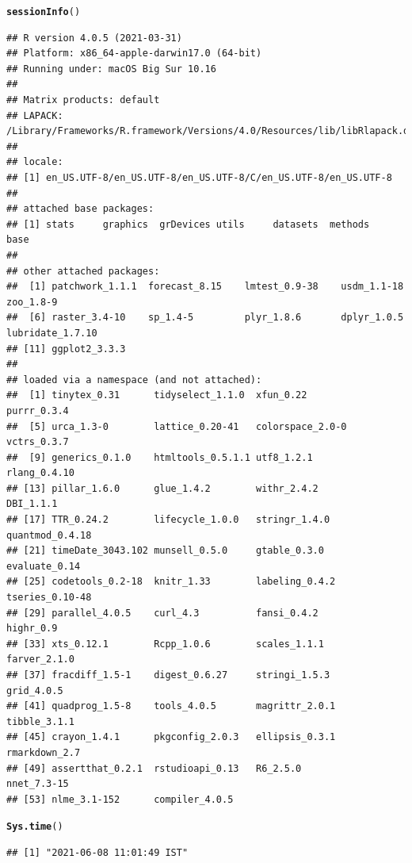 \documentclass{article}\usepackage[]{graphicx}\usepackage[]{color}
\makeatletter
\newcommand{\hlstd}[1]{\textcolor[rgb]{0.345,0.345,0.345}{#1}}%
\newcommand{\hlkwd}[1]{\textcolor[rgb]{0.737,0.353,0.396}{\textbf{#1}}}%
\newenvironment{kframe}{%
 \def\at@end@of@kframe{}%
 \ifinner\ifhmode%
  \def\at@end@of@kframe{\end{minipage}}%
  \begin{minipage}{\columnwidth}%
 \fi\fi%
 \def\FrameCommand##1{\hskip\@totalleftmargin \hskip-\fboxsep
 \colorbox{shadecolor}{##1}\hskip-\fboxsep
     \hskip-\linewidth \hskip-\@totalleftmargin \hskip\columnwidth}%
 \MakeFramed {\advance\hsize-\width
   \@totalleftmargin\z@ \linewidth\hsize
   \@setminipage}}%
 {\par\unskip\endMakeFramed%
 \at@end@of@kframe}
\newenvironment{knitrout}{}{} %
\makeatother
\begin{document}
\begin{knitrout}
\color{fgcolor}\begin{kframe}
\begin{alltt}
\hlkwd{sessionInfo}\hlstd{()}
\end{alltt}
\begin{verbatim}
## R version 4.0.5 (2021-03-31)
## Platform: x86_64-apple-darwin17.0 (64-bit)
## Running under: macOS Big Sur 10.16
## 
## Matrix products: default
## LAPACK: /Library/Frameworks/R.framework/Versions/4.0/Resources/lib/libRlapack.dylib
## 
## locale:
## [1] en_US.UTF-8/en_US.UTF-8/en_US.UTF-8/C/en_US.UTF-8/en_US.UTF-8
## 
## attached base packages:
## [1] stats     graphics  grDevices utils     datasets  methods   base     
## 
## other attached packages:
##  [1] patchwork_1.1.1  forecast_8.15    lmtest_0.9-38    usdm_1.1-18      zoo_1.8-9       
##  [6] raster_3.4-10    sp_1.4-5         plyr_1.8.6       dplyr_1.0.5      lubridate_1.7.10
## [11] ggplot2_3.3.3   
## 
## loaded via a namespace (and not attached):
##  [1] tinytex_0.31      tidyselect_1.1.0  xfun_0.22         purrr_0.3.4      
##  [5] urca_1.3-0        lattice_0.20-41   colorspace_2.0-0  vctrs_0.3.7      
##  [9] generics_0.1.0    htmltools_0.5.1.1 utf8_1.2.1        rlang_0.4.10     
## [13] pillar_1.6.0      glue_1.4.2        withr_2.4.2       DBI_1.1.1        
## [17] TTR_0.24.2        lifecycle_1.0.0   stringr_1.4.0     quantmod_0.4.18  
## [21] timeDate_3043.102 munsell_0.5.0     gtable_0.3.0      evaluate_0.14    
## [25] codetools_0.2-18  knitr_1.33        labeling_0.4.2    tseries_0.10-48  
## [29] parallel_4.0.5    curl_4.3          fansi_0.4.2       highr_0.9        
## [33] xts_0.12.1        Rcpp_1.0.6        scales_1.1.1      farver_2.1.0     
## [37] fracdiff_1.5-1    digest_0.6.27     stringi_1.5.3     grid_4.0.5       
## [41] quadprog_1.5-8    tools_4.0.5       magrittr_2.0.1    tibble_3.1.1     
## [45] crayon_1.4.1      pkgconfig_2.0.3   ellipsis_0.3.1    rmarkdown_2.7    
## [49] assertthat_0.2.1  rstudioapi_0.13   R6_2.5.0          nnet_7.3-15      
## [53] nlme_3.1-152      compiler_4.0.5
\end{verbatim}
\begin{alltt}
\hlkwd{Sys.time}\hlstd{()}
\end{alltt}
\begin{verbatim}
## [1] "2021-06-08 11:01:49 IST"
\end{verbatim}
\end{kframe}
\end{knitrout}
\end{document}
